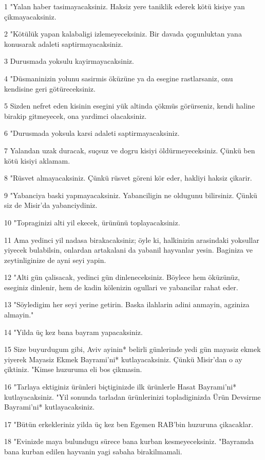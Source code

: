 \par 1 "Yalan haber tasimayacaksiniz. Haksiz yere taniklik ederek kötü kisiye yan çikmayacaksiniz.
\par 2 "Kötülük yapan kalabaligi izlemeyeceksiniz. Bir davada çogunluktan yana konusarak adaleti saptirmayacaksiniz.
\par 3 Durusmada yoksulu kayirmayacaksiniz.
\par 4 "Düsmaninizin yolunu sasirmis öküzüne ya da esegine rastlarsaniz, onu kendisine geri götüreceksiniz.
\par 5 Sizden nefret eden kisinin esegini yük altinda çökmüs görürseniz, kendi haline birakip gitmeyecek, ona yardimci olacaksiniz.
\par 6 "Durusmada yoksula karsi adaleti saptirmayacaksiniz.
\par 7 Yalandan uzak duracak, suçsuz ve dogru kisiyi öldürmeyeceksiniz. Çünkü ben kötü kisiyi aklamam.
\par 8 "Rüsvet almayacaksiniz. Çünkü rüsvet göreni kör eder, hakliyi haksiz çikarir.
\par 9 "Yabanciya baski yapmayacaksiniz. Yabanciligin ne oldugunu bilirsiniz. Çünkü siz de Misir'da yabanciydiniz.
\par 10 "Topraginizi alti yil ekecek, ürününü toplayacaksiniz.
\par 11 Ama yedinci yil nadasa birakacaksiniz; öyle ki, halkinizin arasindaki yoksullar yiyecek bulabilsin, onlardan artakalani da yabanil hayvanlar yesin. Baginiza ve zeytinliginize de ayni seyi yapin.
\par 12 "Alti gün çalisacak, yedinci gün dinleneceksiniz. Böylece hem öküzünüz, eseginiz dinlenir, hem de kadin kölenizin ogullari ve yabancilar rahat eder.
\par 13 "Söyledigim her seyi yerine getirin. Baska ilahlarin adini anmayin, agziniza almayin."
\par 14 "Yilda üç kez bana bayram yapacaksiniz.
\par 15 Size buyurdugum gibi, Aviv ayinin* belirli günlerinde yedi gün mayasiz ekmek yiyerek Mayasiz Ekmek Bayrami'ni* kutlayacaksiniz. Çünkü Misir'dan o ay çiktiniz. "Kimse huzuruma eli bos çikmasin.
\par 16 "Tarlaya ektiginiz ürünleri biçtiginizde ilk ürünlerle Hasat Bayrami'ni* kutlayacaksiniz. "Yil sonunda tarladan ürünlerinizi topladiginizda Ürün Devsirme Bayrami'ni* kutlayacaksiniz.
\par 17 "Bütün erkekleriniz yilda üç kez ben Egemen RAB'bin huzuruna çikacaklar.
\par 18 "Evinizde maya bulundugu sürece bana kurban kesmeyeceksiniz. "Bayramda bana kurban edilen hayvanin yagi sabaha birakilmamali.
